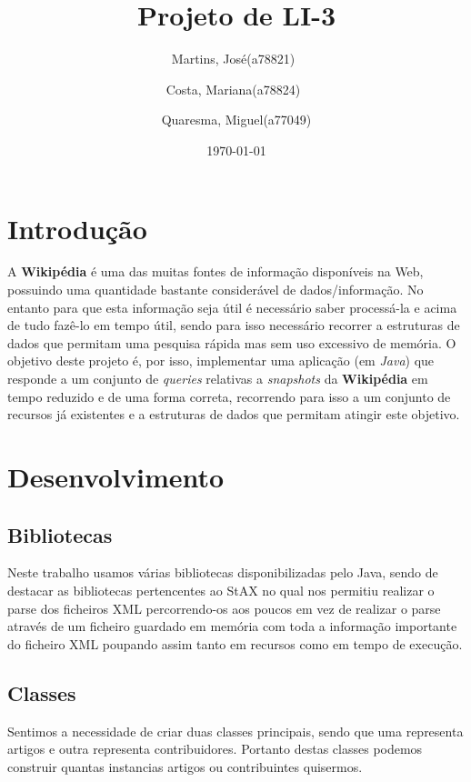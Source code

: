\documentclass[a4paper,11pt]{article}
\title{Projeto de LI-3}
\author{Martins, José(a78821)\
        \and
        Costa, Mariana(a78824)\
        \and
        Quaresma, Miguel(a77049)
        }
\date{\today}
\begin{document}
\begin{titlepage}
\maketitle
\end{titlepage}

\tableofcontents
\newpage

\section{Introdução}
A \textbf{Wikipédia} é uma  das muitas fontes de informação disponíveis na Web, possuindo uma quantidade bastante considerável de dados/informação.
No entanto para que esta informação seja útil é necessário saber processá-la e acima de tudo fazê-lo em tempo útil, sendo para isso necessário recorrer a estruturas de dados que permitam uma pesquisa rápida mas sem uso excessivo de memória. O objetivo deste projeto é, por isso, implementar uma aplicação (em \textit{Java}) que responde a um conjunto de \textit{queries} relativas a \textit{snapshots} da \textbf{Wikipédia} em tempo reduzido e de uma forma correta, recorrendo para isso a um conjunto de recursos já existentes e a estruturas de dados que permitam atingir este objetivo.

\newpage

\section{Desenvolvimento}

\subsection{Bibliotecas}
Neste trabalho usamos várias bibliotecas disponibilizadas pelo Java, sendo de destacar as bibliotecas pertencentes ao StAX no qual nos permitiu realizar o parse dos ficheiros XML percorrendo-os aos poucos em vez de realizar o parse através de um ficheiro guardado em memória com toda a informação importante do ficheiro XML poupando assim tanto em recursos como em tempo de execução. 

\subsection{Classes}
Sentimos a necessidade de criar duas classes principais, sendo que uma representa artigos e outra representa contribuidores. Portanto destas classes podemos construir quantas instancias artigos ou contribuintes quisermos. 
\end{document}
